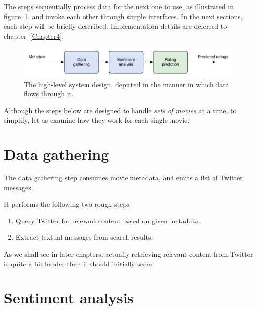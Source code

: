 The steps sequentially process data for the next one to use, as illustrated in figure~\ref{fig:dataflow_modular}, and invoke each other through simple interfaces. In the next sections, each step will be briefly described. Implementation details are deferred to chapter~\ref{Chapter4}.

\begin{figure}[h]
  \centering
    \includegraphics[width=\textwidth]{Figures/dataflow-modular}
  \caption{The high-level system design, depicted in the manner in which data flows through it.}
  \label{fig:dataflow_modular}
\end{figure}


Although the steps below are designed to handle \emph{sets of movies} at a time, to simplify, let us examine how they work for each single movie.

\section{Data gathering} %
\label{sec:data_gathering_step}

The data gathering step consumes movie metadata, and emits a list of Twitter messages.

It performs the following two rough steps:

\begin{enumerate}
  \item Query Twitter for relevant content based on given metadata.
  \item Extract textual messages from search results.
\end{enumerate}

As we shall see in later chapters, actually retrieving relevant content from Twitter is quite a bit harder than it should initially seem.


\section{Sentiment analysis} %
\label{sec:sentiment_analysis_step}

